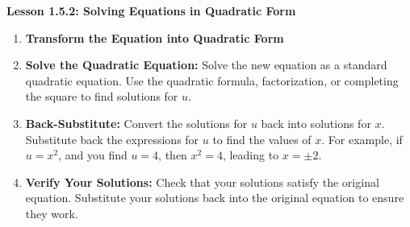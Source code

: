 \begin{center}
\textbf{Lesson 1.5.2: Solving Equations in Quadratic Form}
\end{center}


\begin{enumerate}[label = \color{blue}\arabic*. ]
   \item \textbf{Transform the Equation into Quadratic Form}
   \item \textbf{Solve the Quadratic Equation:} Solve the new equation as a standard quadratic equation. Use the quadratic formula, factorization, or completing the square to find solutions for $u$.
   \item \textbf{Back-Substitute:} Convert the solutions for $u$ back into solutions for $x$. Substitute back the expressions for $u$ to find the values of $x$. For example, if $u = x^2$, and you find $u = 4$, then $x^2 = 4$, leading to $x = \pm 2$.
   \item \textbf{Verify Your Solutions:} Check that your solutions satisfy the original equation. Substitute your solutions back into the original equation to ensure they work.
\end{enumerate}

 
